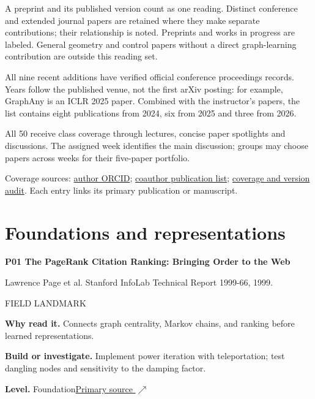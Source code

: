 \documentclass[11pt,letterpaper]{article}
\begin{document}
A preprint and its published version count as one reading. Distinct conference and extended journal papers are retained where they make separate contributions; their relationship is noted. Preprints and works in progress are labeled. General geometry and control papers without a direct graph-learning contribution are outside this reading set.\par
All nine recent additions have verified official conference proceedings records. Years follow the published venue, not the first arXiv posting: for example, GraphAny is an ICLR 2025 paper. Combined with the instructor's papers, the list contains eight publications from 2024, six from 2025 and three from 2026.\par
All 50 receive class coverage through lectures, concise paper spotlights and discussions. The assigned week identifies the main discussion; groups may choose papers across weeks for their five-paper portfolio.\par
Coverage sources: \href{https://orcid.org/0000-0002-6961-0961}{author ORCID}; \href{https://anwar-said.github.io/anwarsaid/CV.pdf}{coauthor publication list}; \href{https://amessbee.github.io/s27/reading_selection.json}{coverage and version audit}. Each entry links its primary publication or manuscript.\par
\clearpage
{}\section*{Foundations and representations}
\begin{minipage}{\linewidth}
{\large\bfseries P01 The PageRank Citation Ranking: Bringing Order to the Web}\par
Lawrence Page et al. Stanford InfoLab Technical Report 1999-66, 1999.\par
\textcolor{ink}{\small FIELD LANDMARK}\par
\textbf{Why read it.} Connects graph centrality, Markov chains, and ranking before learned representations.\par
\textbf{Build or investigate.} Implement power iteration with teleportation; test dangling nodes and sensitivity to the damping factor.\par
\textbf{Level.} Foundation\quad\href{http://ilpubs.stanford.edu:8090/422/}{Primary source $\nearrow$}\par
\end{minipage}\par\vspace{10pt}
\end{document}
